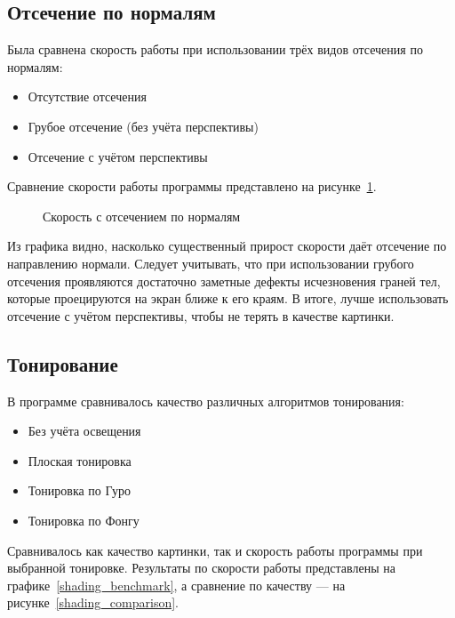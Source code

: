 \documentclass[a4paper,12pt]{report}
\numberwithin{equation}{section}
\begin{document}
\subsection{Отсечение по нормалям}
Была сравнена скорость работы при использовании трёх видов отсечения по нормалям:
\begin{itemize}
\item Отсутствие отсечения
\item Грубое отсечение (без учёта перспективы)
\item Отсечение с учётом перспективы
\end{itemize}
Сравнение скорости работы программы представлено на рисунке~\ref{normal_clipping_bench}.

\begin{figure}[!h]
\centering
{}
\caption{Скорость с отсечением по нормалям}
\label{normal_clipping_bench}
\end{figure}

Из графика видно, насколько существенный прирост скорости даёт отсечение по направлению нормали. Следует учитывать, что при использовании грубого отсечения проявляются достаточно заметные дефекты исчезновения граней тел, которые проецируются на экран ближе к его краям. В итоге, лучше использовать отсечение с учётом перспективы, чтобы не терять в качестве картинки.

\subsection{Тонирование}
В программе сравнивалось качество различных алгоритмов тонирования:
\begin{itemize}
\item Без учёта освещения
\item Плоская тонировка
\item Тонировка по Гуро
\item Тонировка по Фонгу
\end{itemize}
Сравнивалось как качество картинки, так и скорость работы программы при выбранной тонировке. Результаты по скорости работы представлены на графике~\ref{shading_benchmark}, а сравнение по качеству --- на рисунке~\ref{shading_comparison}.
\end{document}
